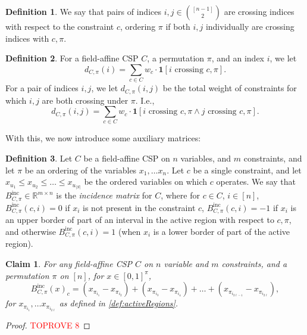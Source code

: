 \documentclass[11pt]{article}
\newtheorem{claim}[theorem]{Claim}
\theoremstyle{definition}
\newtheorem{definition}{Definition}[section]
\newcommand{\R}{\mathbb{R}}
\begin{document}
\begin{definition}
    We say that pairs of indices $i,j \in \binom{[n-1]}{2}$ are crossing indices with respect to the constraint $c$, ordering $\pi$ if both $i, j$ individually are crossing indices with $c, \pi$.
\end{definition}

\begin{definition}\label{def:NumberCrossingGeneral}
	For a field-affine CSP $C$, a permutation $\pi$, and an index $i$, we let
    \[
	 d_{C, \pi}(i) = \sum_{c \in C} w_c \cdot \mathbf{1}[i \text{ crossing } c,\pi].
	\]
    For a pair of
    indices $i, j$, we let $d_{C, \pi}(i,j)$ be the total weight of constraints for which $i,j$ are both crossing under $\pi$. I.e.,
	\[
	 d_{C, \pi}(i,j) = \sum_{c \in C} w_c \cdot \mathbf{1}[i \text{ crossing } c,\pi \wedge j \text{ crossing } c,\pi].
	\]
\end{definition}

With this, we now introduce some auxiliary matrices:

\begin{definition}\label{def:incMatrixGeneral}
	Let $C$ be a field-affine CSP on $n$ variables, and $m$ constraints, and let $\pi$ be an ordering of the variables $x_1, \dots x_n$. Let $c$ be a single constraint, and let $x_{u_1} \leq x_{u_2} \leq \dots \leq x_{u_{|S|}}$ be the ordered variables on which $c$ operates. We say that $B^{\text{inc}}_{C, \pi} \in \R^{m \times n}$ is the \emph{incidence matrix} for $C$, where for $c \in C$, $i \in [n]$, $B^{\text{inc}}_{C, \pi}(c, i) = 0$ if $x_i$ is not present in the constraint $c$, $B^{\text{inc}}_{C, \pi}(c, i) = -1$ if $x_i$ is an upper border of part of an interval in the active region with respect to $c, \pi$, and otherwise $B^{\text{inc}}_{C, \pi}(c, i) = 1$ (when $x_i$ is a lower border of part of the active region). 
\end{definition}

\begin{claim}\label{clm:incidenceGeneral}
	For any field-affine CSP $C$ on $n$ variable and $m$ constraints, and a permutation $\pi$ on $[n]$,  for $x \in [0,1]^{\pi}$, 
    \[
    B^{\text{inc}}_{C, \pi}(x)_c = (x_{\pi_{i_1}} - x_{\pi_{i_2}}) + (x_{\pi_{i_3}} - x_{\pi_{i_4}}) + \dots + (x_{\pi_{i_{2\ell -1}}} - x_{\pi_{i_{2\ell}}}),
    \]
    for $x_{\pi_{i_1}}, \dots x_{\pi_{i_{2\ell}}}$ as defined in \cref{def:activeRegions}.
\end{claim}

\begin{proof}\textcolor{red}{TOPROVE 8}\end{proof}
\end{document}
